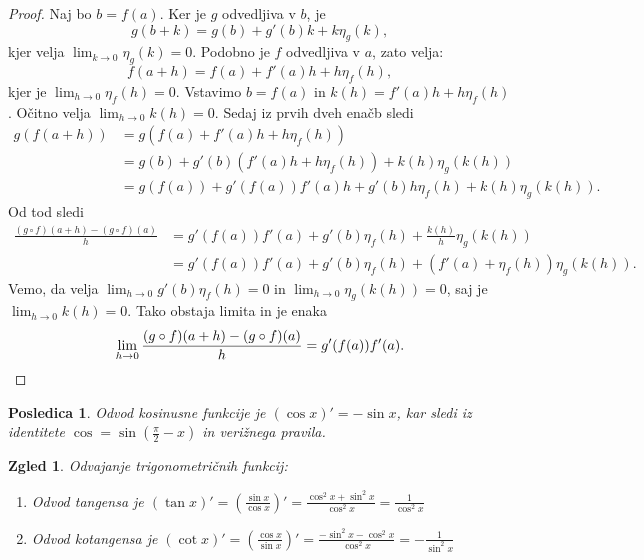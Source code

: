 \documentclass[10pt, a4paper]{article}
\newtheorem{posledica}[izr]{Posledica}
\newtheorem{zgled}{Zgled}[section]
\newenvironment{noticeC}{%
  \tcolorbox[%
  notitle,
  empty,
  enhanced,  %
  breakable,
  coltext=black, 
  fontupper=\rmfamily,
  parbox=false,
  noparskip,
  sharp corners,
  boxrule=-1pt,  %
  frame hidden,
  left=7pt,  %
  right=7pt,
  top=5pt,
  bottom=5pt,
  before skip=2.5ex plus 2pt,
  after skip=2.5ex plus 2pt,
  overlay unbroken and last={%
  },
  ]}
{\endtcolorbox}
\newenvironment{dokaz}%
  {\begin{noticeC}\begin{proof}}%
  {\end{proof}\end{noticeC}}
\newcommand{\limf}[3]{\lim_{#1 \to #2} {#3}}
\begin{document}
\begin{dokaz}
    Naj bo $b = f(a)$. 
    Ker je $g$ odvedljiva v $b$, je $$g(b + k) = g(b) + g'(b) k + k \eta_g (k),$$ 
    kjer velja $\limf{k}{0}{\eta_g (k)} = 0.$
    Podobno je $f$ odvedljiva v $a$, zato velja:
    $$f(a + h) = f(a) + f'(a) h + h \eta_f (h),$$
    kjer je $\limf{h}{0}{\eta_f (h)} = 0.$
    Vstavimo $b = f(a)$ in $k(h) = f'(a) h + h \eta_f (h)$. 
    Očitno velja $\limf{h}{0}{k(h)} = 0$.
    Sedaj iz prvih dveh enačb sledi
    \begin{align*}
        g(f(a+h)) &= g(f(a) + f'(a) h + h \eta_f (h))\\
        &= g(b) + g'(b) (f'(a) h + h \eta_f (h)) + k(h) \eta_g (k(h))\\
        &= g(f(a)) + g'(f(a)) f'(a) h + g'(b) h \eta_f (h) + k(h) \eta_g (k(h)).
    \end{align*}
    Od tod sledi 
    \begin{align*}
        \frac{(g\circ f) (a+h) - (g \circ f) (a)}{h} &= g'(f(a)) f'(a) + g'(b) \eta_f (h) + \frac{k(h)}{h} \eta_g (k(h))\\
        &= g'(f(a)) f'(a) + g'(b) \eta_f (h) + (f'(a) + \eta_f (h)) \eta_g (k(h)).
    \end{align*}
    Vemo, da velja $\limf{h}{0}{g'(b) \eta_f (h)} = 0$ in $\limf{h}{0}{\eta_g (k(h))} = 0$, saj je $\limf{h}{0}{k(h)} = 0$.
    Tako obstaja limita in je enaka
    \begin{equation*}
        \limf{h}{0}{\frac{(g\circ f) (a+h) - (g \circ f) (a)}{h}} = g'(f(a)) f'(a). \qedhere
    \end{equation*}
\end{dokaz}

\begin{posledica}
    Odvod kosinusne funkcije je $(\cos x)' = - \sin x$, kar sledi iz identitete $\cos = \sin \left(\frac{\pi}{2} - x\right)$ in verižnega pravila.
\end{posledica}

\begin{zgled}
    Odvajanje trigonometričnih funkcij:
    \begin{enumerate}
        \item Odvod tangensa je $(\tan x)' = (\frac{\sin x}{\cos x})' = \frac{\cos^2 x + \sin^2 x}{\cos^2 x} = \frac{1}{\cos^2 x}$
        \item Odvod kotangensa je $(\cot x)' = (\frac{\cos x}{\sin x})' = \frac{-\sin^2 x - \cos^2 x}{\cos^2 x} = -\frac{1}{\sin^2 x}$
    \end{enumerate}
\end{zgled}
\end{document}
